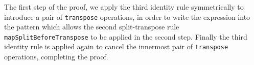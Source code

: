 \documentclass{l4proj}
\begin{document}
\begin{code}
\AgdaSymbol{(}\AgdaSpace{}%
\AgdaSymbol{(}\AgdaSpace{}%
\AgdaSymbol{)}\AgdaSpace{}%
\AgdaSymbol{(}\AgdaSpace{}%
\AgdaSymbol{)))}\AgdaSpace{}%
\<%
\\
\>[2][@{}l@{\AgdaIndent{0}}]%
\>[4]\AgdaSpace{}%
\AgdaSymbol{(}\AgdaSpace{}%
\AgdaSymbol{(}\AgdaSpace{}%
\AgdaSymbol{(}\AgdaSpace{}%
\AgdaSymbol{)}\AgdaSpace{}%
\AgdaSymbol{(}\AgdaSpace{}%
\AgdaSymbol{)))}\<%
\\
%
\>[2]\AgdaSpace{}%
\AgdaSpace{}%
\AgdaSpace{}%
\AgdaSymbol{(}\AgdaSpace{}%
\AgdaSpace{}%
\AgdaSymbol{(}\AgdaSpace{}%
\AgdaSymbol{))}\AgdaSpace{}%
\<%
\\
\>[2][@{}l@{\AgdaIndent{0}}]%
\>[4]\AgdaSpace{}%
\AgdaSymbol{(}\AgdaSpace{}%
\AgdaSpace{}%
\AgdaSymbol{(}\AgdaSpace{}%
\AgdaSpace{}%
\AgdaSymbol{(}\AgdaSpace{}%
\AgdaSymbol{(}\AgdaSpace{}%
\AgdaSymbol{))))}\<%
\\
%
\>[2]\AgdaSpace{}%
\AgdaSpace{}%
\AgdaSpace{}%
\AgdaSpace{}%
\AgdaSpace{}%
\AgdaSpace{}%
\AgdaSymbol{(}\AgdaSpace{}%
\AgdaSpace{}%
\AgdaSymbol{(}\AgdaSpace{}%
\AgdaSpace{}%
\AgdaSymbol{)))}\AgdaSpace{}%
\AgdaSymbol{(}\AgdaSpace{}%
\AgdaSymbol{)}\AgdaSpace{}%
\<%
\\
\>[2][@{}l@{\AgdaIndent{0}}]%
\>[4]\<%
\end{code}
The first step of the proof, we apply the third identity rule symmetrically to introduce a pair of \texttt{transpose} operations, in order to write the expression into the pattern which allows the second split-transpose rule \texttt{mapSplitBeforeTranspose} to be applied in the second step. Finally the third identity rule is applied again to cancel the innermost pair of \texttt{transpose} operations, completing the proof.
\end{document}
